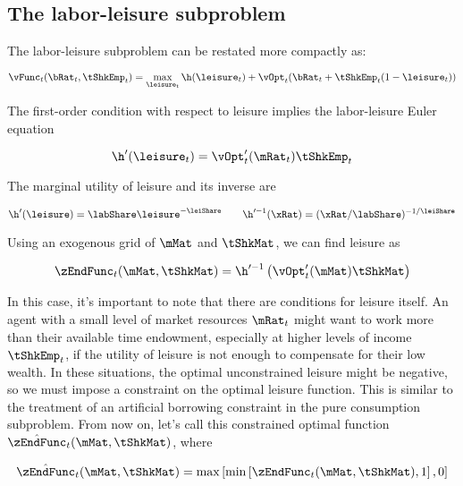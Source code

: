 \documentclass[\econtexRoot/SequentialEGM]{subfiles}
\begin{document}
\subsection{The labor-leisure subproblem}

The labor-leisure subproblem can  be restated more compactly as:

\begin{equation}
  \vFunc_{t}(\bRat_{t}, \tShkEmp_{t}) = \max_{ \leisure_{t}}
  \h(\leisure_{t}) + \vOpt_{t}(\bRat_{t} +
  \tShkEmp_{t}(1-\leisure_{t}))
\end{equation}

The first-order condition with respect to leisure implies the labor-leisure Euler equation

\begin{equation}
  \h'(\leisure_{t}) =	\vOpt_{t}'(\mRat_{t}) \tShkEmp_{t}
\end{equation}

The marginal utility of leisure and its inverse are

\begin{equation}
  \h'(\leisure) = \labShare\leisure^{-\leiShare} \qquad
  \h'^{-1}(\xRat) = (\xRat/\labShare)^{-1/\leiShare}
\end{equation}

Using an exogenous grid of $\mMat$ and $\tShkMat$, we can find leisure as

\begin{equation}
  \zEndFunc_{t}(\mMat, \tShkMat) = \h'^{-1}\left(
  \vOpt_{t}'(\mMat) \tShkMat \right)
\end{equation}

In this case, it's important to note that there are conditions for leisure itself. An agent with a small level of market resources $\mRat_{t}$ might want to work more than their available time endowment, especially at higher levels of income $\tShkEmp_{t}$, if the utility of leisure is not enough to compensate for their low wealth. In these situations, the optimal unconstrained leisure might be negative, so we must impose a constraint on the optimal leisure function. This is similar to the treatment of an artificial borrowing constraint in the pure consumption subproblem. From now on, let's call this constrained optimal function $\hat{\zEndFunc}_{t}(\mMat, \tShkMat)$, where

\begin{equation}
  \hat{\zEndFunc}_{t}(\mMat, \tShkMat) = \max \left[ \min \left[ \zEndFunc_{t}(\mMat, \tShkMat), 1 \right], 0 \right]
\end{equation}
\end{document}
